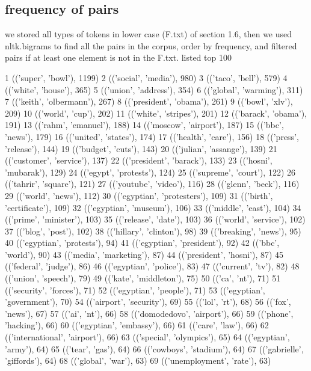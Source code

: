 \documentclass[a4paper, 11pt]{article}
\begin{document}
\subsection{frequency of pairs}
we stored all types of tokens in lower case (F.txt) of section 1.6, then we used nltk.bigrams to find all the pairs in the corpus, order by frequency, and filtered pairs if at least one element is not in the F.txt. \newline
listed top 100
\begin{spverbatim}
1 (('super', 'bowl'), 1199)
2 (('social', 'media'), 980)
3 (('taco', 'bell'), 579)
4 (('white', 'house'), 365)
5 (('union', 'address'), 354)
6 (('global', 'warming'), 311)
7 (('keith', 'olbermann'), 267)
8 (('president', 'obama'), 261)
9 (('bowl', 'xlv'), 209)
10 (('world', 'cup'), 202)
11 (('white', 'stripes'), 201)
12 (('barack', 'obama'), 191)
13 (('rahm', 'emanuel'), 188)
14 (('moscow', 'airport'), 187)
15 (('bbc', 'news'), 179)
16 (('united', 'states'), 174)
17 (('health', 'care'), 156)
18 (('press', 'release'), 144)
19 (('budget', 'cuts'), 143)
20 (('julian', 'assange'), 139)
21 (('customer', 'service'), 137)
22 (('president', 'barack'), 133)
23 (('hosni', 'mubarak'), 129)
24 (('egypt', 'protests'), 124)
25 (('supreme', 'court'), 122)
26 (('tahrir', 'square'), 121)
27 (('youtube', 'video'), 116)
28 (('glenn', 'beck'), 116)
29 (('world', 'news'), 112)
30 (('egyptian', 'protesters'), 109)
31 (('birth', 'certificate'), 109)
32 (('egyptian', 'museum'), 106)
33 (('middle', 'east'), 104)
34 (('prime', 'minister'), 103)
35 (('release', 'date'), 103)
36 (('world', 'service'), 102)
37 (('blog', 'post'), 102)
38 (('hillary', 'clinton'), 98)
39 (('breaking', 'news'), 95)
40 (('egyptian', 'protests'), 94)
41 (('egyptian', 'president'), 92)
42 (('bbc', 'world'), 90)
43 (('media', 'marketing'), 87)
44 (('president', 'hosni'), 87)
45 (('federal', 'judge'), 86)
46 (('egyptian', 'police'), 83)
47 (('current', 'tv'), 82)
48 (('union', 'speech'), 79)
49 (('kate', 'middleton'), 75)
50 (('ca', 'nt'), 71)
51 (('security', 'forces'), 71)
52 (('egyptian', 'people'), 71)
53 (('egyptian', 'government'), 70)
54 (('airport', 'security'), 69)
55 (('lol', 'rt'), 68)
56 (('fox', 'news'), 67)
57 (('ai', 'nt'), 66)
58 (('domodedovo', 'airport'), 66)
59 (('phone', 'hacking'), 66)
60 (('egyptian', 'embassy'), 66)
61 (('care', 'law'), 66)
62 (('international', 'airport'), 66)
63 (('special', 'olympics'), 65)
64 (('egyptian', 'army'), 64)
65 (('tear', 'gas'), 64)
66 (('cowboys', 'stadium'), 64)
67 (('gabrielle', 'giffords'), 64)
68 (('global', 'war'), 63)
69 (('unemployment', 'rate'), 63)

\end{spverbatim}
\end{document}
